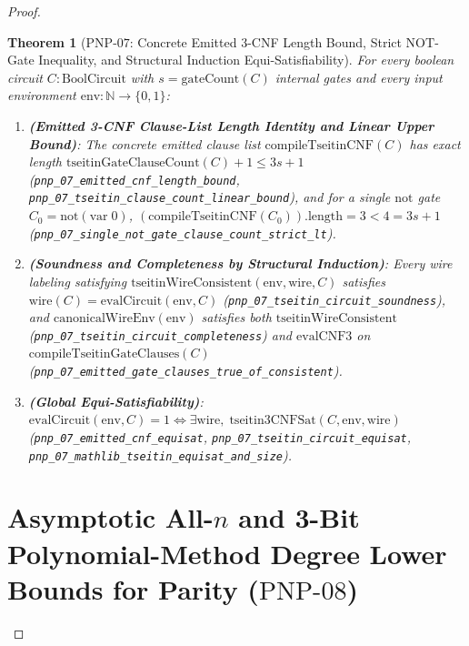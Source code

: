 \documentclass[11pt,a4paper]{article}
\theoremstyle{plain}
\newtheorem{theorem}{Theorem}[section]
\theoremstyle{definition}
\theoremstyle{remark}
\newcommand{\N}{\mathbb{N}}
\begin{document}
\begin{proof}
\begin{theorem}[$\mathrm{PNP\text{-}07}$: Concrete Emitted 3-CNF Length Bound, Strict $\mathrm{NOT}$-Gate Inequality, and Structural Induction Equi-Satisfiability]\label{thm:pnp07}
For every boolean circuit $C : \mathrm{BoolCircuit}$ with $s = \mathrm{gateCount}(C)$ internal gates and every input environment $\mathrm{env} : \N \to \{0, 1\}$:
\begin{enumerate}
  \item \textbf{(Emitted 3-CNF Clause-List Length Identity and Linear Upper Bound)}: The concrete emitted clause list $\mathrm{compileTseitinCNF}(C)$ has exact length $\mathrm{tseitinGateClauseCount}(C) + 1 \le 3s + 1$ (\texttt{pnp\_07\_emitted\_cnf\_length\_bound}, \texttt{pnp\_07\_tseitin\_clause\_count\_linear\_bound}), and for a single $\mathrm{not}$ gate $C_0 = \mathrm{not}(\mathrm{var}\;0)$, $(\mathrm{compileTseitinCNF}(C_0)).\mathrm{length} = 3 < 4 = 3s + 1$ (\texttt{pnp\_07\_single\_not\_gate\_clause\_count\_strict\_lt}).
  \item \textbf{(Soundness and Completeness by Structural Induction)}: Every wire labeling satisfying $\mathrm{tseitinWireConsistent}(\mathrm{env}, \mathrm{wire}, C)$ satisfies $\mathrm{wire}(C) = \mathrm{evalCircuit}(\mathrm{env}, C)$ (\texttt{pnp\_07\_tseitin\_circuit\_soundness}), and $\mathrm{canonicalWireEnv}(\mathrm{env})$ satisfies both $\mathrm{tseitinWireConsistent}$ (\texttt{pnp\_07\_tseitin\_circuit\_completeness}) and $\mathrm{evalCNF3}$ on $\mathrm{compileTseitinGateClauses}(C)$ (\texttt{pnp\_07\_emitted\_gate\_clauses\_true\_of\_consistent}).
  \item \textbf{(Global Equi-Satisfiability)}: $\mathrm{evalCircuit}(\mathrm{env}, C) = 1 \iff \exists \mathrm{wire},\; \mathrm{tseitin3CNFSat}(C, \mathrm{env}, \mathrm{wire})$ (\texttt{pnp\_07\_emitted\_cnf\_equisat}, \texttt{pnp\_07\_tseitin\_circuit\_equisat}, \texttt{pnp\_07\_mathlib\_tseitin\_equisat\_and\_size}).
\end{enumerate}
\end{theorem}

\section{Asymptotic All-\texorpdfstring{$n$}{n} and 3-Bit Polynomial-Method Degree Lower Bounds for Parity (\texorpdfstring{$\mathrm{PNP\text{-}08}$}{PNP-08})}


\end{proof}
\end{document}

